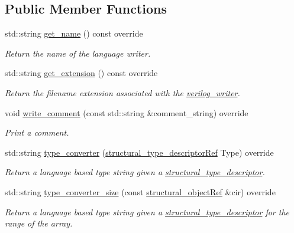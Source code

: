 \subsection*{Public Member Functions}
\begin{DoxyCompactItemize}
\item 
std\+::string \hyperlink{classverilog__writer_a59b2afa9a031c6fff601b4f349dd434b}{get\+\_\+name} () const override
\begin{DoxyCompactList}\small\item\em Return the name of the language writer. \end{DoxyCompactList}\item 
std\+::string \hyperlink{classverilog__writer_a4dade87869d04a1a2b166efa8c0a2253}{get\+\_\+extension} () const override
\begin{DoxyCompactList}\small\item\em Return the filename extension associated with the \hyperlink{classverilog__writer}{verilog\+\_\+writer}. \end{DoxyCompactList}\item 
void \hyperlink{classverilog__writer_ab013209d73c10f53c87bb1b7a2666ff0}{write\+\_\+comment} (const std\+::string \&comment\+\_\+string) override
\begin{DoxyCompactList}\small\item\em Print a comment. \end{DoxyCompactList}\item 
std\+::string \hyperlink{classverilog__writer_a20595dc1f543de374aeb4ec2f577971d}{type\+\_\+converter} (\hyperlink{structural__objects_8hpp_a219296792577e3292783725961506c83}{structural\+\_\+type\+\_\+descriptor\+Ref} Type) override
\begin{DoxyCompactList}\small\item\em Return a language based type string given a \hyperlink{structstructural__type__descriptor}{structural\+\_\+type\+\_\+descriptor}. \end{DoxyCompactList}\item 
std\+::string \hyperlink{classverilog__writer_aa7a775e57ed2f7d4d613352bd239a279}{type\+\_\+converter\+\_\+size} (const \hyperlink{structural__objects_8hpp_a8ea5f8cc50ab8f4c31e2751074ff60b2}{structural\+\_\+object\+Ref} \&cir) override
\begin{DoxyCompactList}\small\item\em Return a language based type string given a \hyperlink{structstructural__type__descriptor}{structural\+\_\+type\+\_\+descriptor} for the range of the array. \end{DoxyCompactList}\item 

\end{DoxyCompactItemize}
